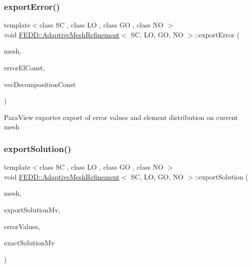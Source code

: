 \subsubsection{\texorpdfstring{export\+Error()}{exportError()}}
{\footnotesize\ttfamily template$<$class SC , class LO , class GO , class NO $>$ \\
void \hyperlink{classFEDD_1_1AdaptiveMeshRefinement}{F\+E\+D\+D\+::\+Adaptive\+Mesh\+Refinement}$<$ SC, LO, GO, NO $>$\+::export\+Error (\begin{DoxyParamCaption}\item[{\hyperlink{classFEDD_1_1AdaptiveMeshRefinement_abc927c0c0253b094c3c53338f9128d20}{Mesh\+Unstr\+Ptr\+\_\+\+Type}}]{mesh,  }\item[{\hyperlink{classFEDD_1_1AdaptiveMeshRefinement_ad8871639b0a35039184611ce286a446c}{Multi\+Vector\+Const\+Ptr\+\_\+\+Type}}]{error\+El\+Const,  }\item[{\hyperlink{classFEDD_1_1AdaptiveMeshRefinement_ad8871639b0a35039184611ce286a446c}{Multi\+Vector\+Const\+Ptr\+\_\+\+Type}}]{vec\+Decomposition\+Const }\end{DoxyParamCaption})}

Para\+View exporter export of error values and element distribution on current mesh \mbox{\label{classFEDD_1_1AdaptiveMeshRefinement_adfbce243e105dff484cc3a516ced0019}} 
\subsubsection{\texorpdfstring{export\+Solution()}{exportSolution()}}
{\footnotesize\ttfamily template$<$class SC , class LO , class GO , class NO $>$ \\
void \hyperlink{classFEDD_1_1AdaptiveMeshRefinement}{F\+E\+D\+D\+::\+Adaptive\+Mesh\+Refinement}$<$ SC, LO, GO, NO $>$\+::export\+Solution (\begin{DoxyParamCaption}\item[{\hyperlink{classFEDD_1_1AdaptiveMeshRefinement_abc927c0c0253b094c3c53338f9128d20}{Mesh\+Unstr\+Ptr\+\_\+\+Type}}]{mesh,  }\item[{\hyperlink{classFEDD_1_1AdaptiveMeshRefinement_ad8871639b0a35039184611ce286a446c}{Multi\+Vector\+Const\+Ptr\+\_\+\+Type}}]{export\+Solution\+Mv,  }\item[{\hyperlink{classFEDD_1_1AdaptiveMeshRefinement_ad8871639b0a35039184611ce286a446c}{Multi\+Vector\+Const\+Ptr\+\_\+\+Type}}]{error\+Values,  }\item[{\hyperlink{classFEDD_1_1AdaptiveMeshRefinement_ad8871639b0a35039184611ce286a446c}{Multi\+Vector\+Const\+Ptr\+\_\+\+Type}}]{exact\+Solution\+Mv }\end{DoxyParamCaption})}

